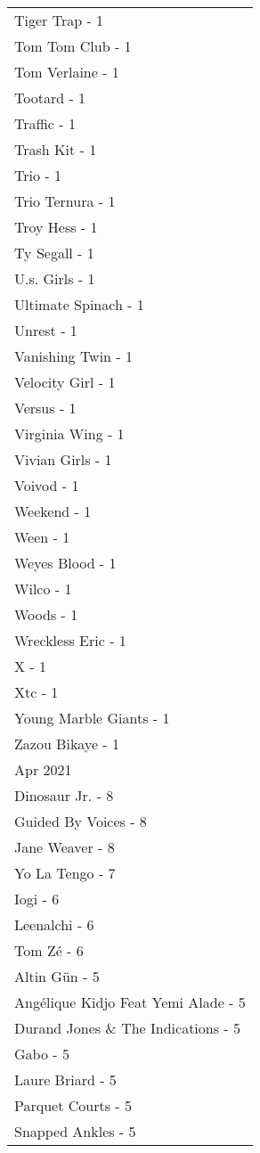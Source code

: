 \documentclass[
]{article}
\begin{document}
\begin{longtable}{l}
Tiger Trap - 1 \\ 
Tom Tom Club - 1 \\ 
Tom Verlaine - 1 \\ 
Tootard - 1 \\ 
Traffic - 1 \\ 
Trash Kit - 1 \\ 
Trio - 1 \\ 
Trio Ternura - 1 \\ 
Troy Hess - 1 \\ 
Ty Segall - 1 \\ 
U.s. Girls - 1 \\ 
Ultimate Spinach - 1 \\ 
Unrest - 1 \\ 
Vanishing Twin - 1 \\ 
Velocity Girl - 1 \\ 
Versus - 1 \\ 
Virginia Wing - 1 \\ 
Vivian Girls - 1 \\ 
Voivod - 1 \\ 
Weekend - 1 \\ 
Ween - 1 \\ 
Weyes Blood - 1 \\ 
Wilco - 1 \\ 
Woods - 1 \\ 
Wreckless Eric - 1 \\ 
X - 1 \\ 
Xtc - 1 \\ 
Young Marble Giants - 1 \\ 
Zazou Bikaye - 1 \\ 
\midrule
\multicolumn{1}{l}{Apr 2021} \\ 
\midrule
Dinosaur Jr. - 8 \\ 
Guided By Voices - 8 \\ 
Jane Weaver - 8 \\ 
Yo La Tengo - 7 \\ 
Iogi - 6 \\ 
Leenalchi - 6 \\ 
Tom Zé - 6 \\ 
Altin Gün - 5 \\ 
Angélique Kidjo Feat Yemi Alade - 5 \\ 
Durand Jones \& The Indications - 5 \\ 
Gabo - 5 \\ 
Laure Briard - 5 \\ 
Parquet Courts - 5 \\ 
Snapped Ankles - 5 \\ 

\end{longtable}
\end{document}
